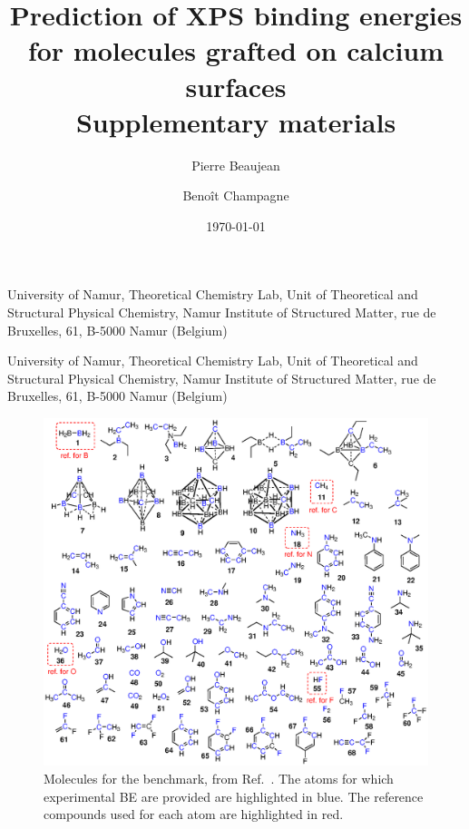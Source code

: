 \documentclass[%
aip,
amsmath,amssymb,
preprint,%
]{revtex4-2}
\begin{document}
	\title{Prediction of XPS binding energies for molecules grafted on calcium surfaces\\ Supplementary materials}
	
	\author{Pierre Beaujean}
	\affiliation
	{University of Namur, Theoretical Chemistry Lab, Unit of Theoretical and Structural Physical Chemistry, Namur Institute of Structured Matter, rue de Bruxelles, 61, B-5000 Namur (Belgium)}
	
	
	\author{Benoît Champagne}
	\affiliation
	{University of Namur, Theoretical Chemistry Lab, Unit of Theoretical and Structural Physical Chemistry, Namur Institute of Structured Matter, rue de Bruxelles, 61, B-5000 Namur (Belgium)}
	
	\date{\today}
	
	\maketitle

\begin{figure}[!h]
	\centering
	\includegraphics[width=\linewidth]{FigureS1}
	\caption{Molecules for the benchmark, from Ref.~. The atoms for which experimental BE are provided are highlighted in blue.  The reference compounds used for each atom are highlighted in red.}
	\label{fig:core185}
\end{figure}
\end{document}
